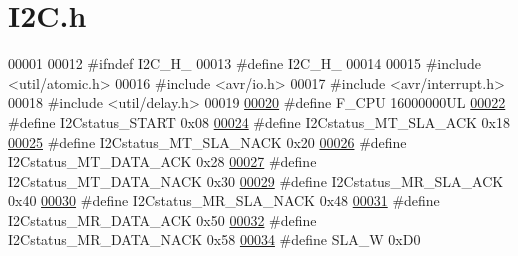 \hypertarget{_i2_c_8h_source}{}\section{I2\+C.\+h}
\label{_i2_c_8h_source}

\begin{DoxyCode}
00001 
00012 \textcolor{preprocessor}{#ifndef I2C\_H\_}
00013 \textcolor{preprocessor}{#define I2C\_H\_}
00014 
00015 \textcolor{preprocessor}{#include <util/atomic.h>}
00016 \textcolor{preprocessor}{#include <avr/io.h>}
00017 \textcolor{preprocessor}{#include <avr/interrupt.h>}
00018 \textcolor{preprocessor}{#include <util/delay.h>}
00019 
\hypertarget{_i2_c_8h_source.tex_l00020}{}\hyperlink{_i2_c_8h_a43bafb28b29491ec7f871319b5a3b2f8}{00020} \textcolor{preprocessor}{#define F\_CPU 16000000UL                }
\hypertarget{_i2_c_8h_source.tex_l00022}{}\hyperlink{_i2_c_8h_ae106ed126eff0ffa33378daacfbbcdb7}{00022} \textcolor{preprocessor}{#define I2Cstatus\_START 0x08            }
\hypertarget{_i2_c_8h_source.tex_l00024}{}\hyperlink{_i2_c_8h_a86ef56020aa435f9af57015ee220c3e4}{00024} \textcolor{preprocessor}{#define I2Cstatus\_MT\_SLA\_ACK 0x18       }
\hypertarget{_i2_c_8h_source.tex_l00025}{}\hyperlink{_i2_c_8h_a28004b2b2ef10d3131ac4c4756da0ba0}{00025} \textcolor{preprocessor}{#define I2Cstatus\_MT\_SLA\_NACK 0x20      }
\hypertarget{_i2_c_8h_source.tex_l00026}{}\hyperlink{_i2_c_8h_a083e480a49a539cd4740d0e1a15216f3}{00026} \textcolor{preprocessor}{#define I2Cstatus\_MT\_DATA\_ACK 0x28      }
\hypertarget{_i2_c_8h_source.tex_l00027}{}\hyperlink{_i2_c_8h_a9de9a018a3f258d9e7a9ce44fb9e5cd1}{00027} \textcolor{preprocessor}{#define I2Cstatus\_MT\_DATA\_NACK 0x30     }
\hypertarget{_i2_c_8h_source.tex_l00029}{}\hyperlink{_i2_c_8h_af046bfee1b2f1837e8a043ead63f8152}{00029} \textcolor{preprocessor}{#define I2Cstatus\_MR\_SLA\_ACK 0x40       }
\hypertarget{_i2_c_8h_source.tex_l00030}{}\hyperlink{_i2_c_8h_ae17f24111fe34b4aa114e90824b7865a}{00030} \textcolor{preprocessor}{#define I2Cstatus\_MR\_SLA\_NACK 0x48      }
\hypertarget{_i2_c_8h_source.tex_l00031}{}\hyperlink{_i2_c_8h_aae56c6775054400d706c68b4701a1659}{00031} \textcolor{preprocessor}{#define I2Cstatus\_MR\_DATA\_ACK 0x50      }
\hypertarget{_i2_c_8h_source.tex_l00032}{}\hyperlink{_i2_c_8h_a3678a376b6b796511e60d0eda8a89dbe}{00032} \textcolor{preprocessor}{#define I2Cstatus\_MR\_DATA\_NACK 0x58     }
\hypertarget{_i2_c_8h_source.tex_l00034}{}\hyperlink{_i2_c_8h_a3df22e1e7b66be8b74b33ce077824292}{00034} \textcolor{preprocessor}{#define SLA\_W 0xD0                      }

\end{DoxyCode}
